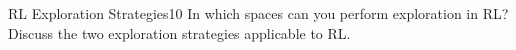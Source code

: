 
\begin{questions}
	

\begin{question}{RL Exploration Strategies}{10}
	In which spaces can you perform exploration in RL? Discuss the two  exploration strategies applicable to RL.
	
	\begin{answer}

	\end{answer}
\end{question}




\end{questions}